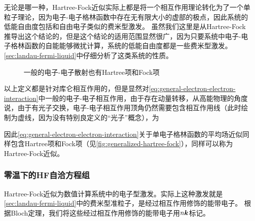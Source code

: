 无论是哪一种，Hartree-Fock近似实际上都是将一个相互作用理论转化为了一个单粒子理论，因为电子-电子格林函数中存在无有限大小的虚部的极点，因此系统的低能自由度包括和自由电子类似的费米型激发。
虽然我们这里是从Hartree-Fock推导出这个结论的，但是这个结论的适用范围显然很广，因为只要系统中电子-电子格林函数的自能能够微扰计算，系统的低能自由度都是一些费米型激发。
\autoref{sec:landau-fermi-liquid}中仔细分析了这类系统的性质。

\begin{figure}
    \centering
    
    \caption{一般的电子-电子散射也有Hartree项和Fock项}
    \label{fig:generalized-hartree-fock}
\end{figure}

以上定义都是针对库仑相互作用的，但是显然对\eqref{eq:general-electron-electron-interaction}中一般的电子-电子相互作用，由于存在动量转移，从高能物理的角度说，由于有光子交换，电子-电子相互作用顶角仍然需要包含相互作用线（此时绘制为虚线，因为没有特别良定义的“光子”概念），为

因此\eqref{eq:general-electron-electron-interaction}关于单电子格林函数的平均场近似同样包含Hartree项和Fock项（见\autoref{fig:generalized-hartree-fock}），同样可以称为Hartree-Fock近似。

\subsubsection{零温下的HF自洽方程组}


Hartree-Fock近似为数值计算系统中的电子型激发。实际上这种激发就是\autoref{sec:landau-fermi-liquid}中的费米型准粒子，是经过相互作用修饰的能带电子。
根据Bloch定理，我们将这些经过相互作用修饰的能带电子用$n \vb*{k}$标记。

